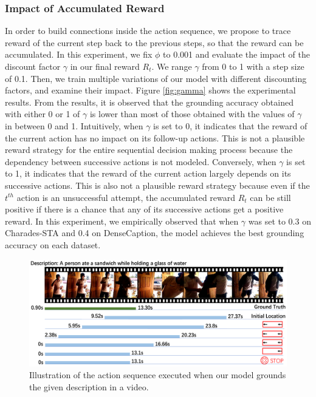 \documentclass[letterpaper]{article} %
\begin{document}
\subsubsection{Impact of Accumulated Reward}
In order to build connections inside the action sequence, we propose to trace reward of the current step back to the previous steps, so that the reward can be accumulated. In this experiment, we fix $\phi$ to 0.001 and evaluate the impact of the discount factor $\gamma$ in our final reward $R_t$. We range $\gamma$ from 0 to 1 with a step size of 0.1. Then, we train multiple variations of our model with different discounting factors, and examine their impact. Figure \ref{fig:gamma} shows the experimental results.
From the results, it is observed that the grounding accuracy obtained with either 0 or 1 of $\gamma$ is lower than most of those obtained with the values of $\gamma$ in between 0 and 1. Intuitively, when $\gamma$ is set to 0, it indicates that the reward of the current action has no impact on its follow-up actions. This is not a plausible reward strategy for the entire sequential decision making process because the dependency between successive actions is not modeled. Conversely, when $\gamma$ is set to 1, it indicates that the reward of the current action largely depends on its successive actions. This is also not a plausible reward strategy because even if the $t^{th}$ action is an unsuccessful attempt, the accumulated reward $R_t$ can be still positive if there is a chance that any of its successive actions get a positive reward. In this experiment, we empirically observed that when $\gamma$ was set to 0.3 on Charades-STA and 0.4 on DenseCaption, the model achieves the best grounding accuracy on each dataset.

\begin{figure}[t]
\begin{center}
\includegraphics[width=0.825\linewidth]{./demo.pdf}
\end{center}
\caption{Illustration of the action sequence executed when our model grounds the given description in a video.}
\label{fig:demo}
\end{figure}
\end{document}
